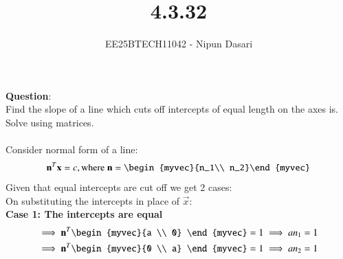 \documentclass[journal]{IEEEtran}
\begin{document}
	
	
	\vspace{3cm}
	
	\title{4.3.32}
	\author{EE25BTECH11042 - Nipun Dasari}
	\maketitle
		
	\renewcommand{\thefigure}{\theenumi}
	\renewcommand{\thetable}{\theenumi}
	\setlength{\intextsep}{10pt} %
	
	
	\renewcommand{\thetable}{\theenumi}
	
	\textbf{Question}:\\
	Find the slope of a line which cuts off intercepts of equal length on the axes is. Solve using matrices. \\ 
	\solution \\
	
	Consider normal form of a line:
	\begin{align}
		\vec{n}^T\vec{x} = c, \text{where } \vec{n} = \begin{myvec}{n_1\\ n_2}\end{myvec}
	\end{align}
	Given that equal intercepts are cut off we get 2 cases:\\
	On substituting the intercepts in place of $\vec{x}$: \\
	\textbf{Case 1: The intercepts are equal }
	\begin{align}
		\implies  \vec{n}^T\begin{myvec}{a \\ 0} \end{myvec} = 1 \implies an_1 = 1 \label{0.2}\\
		\implies \vec{n}^T\begin{myvec}{0 \\ a} \end{myvec} = 1 \implies an_2 = 1 \label{0.3} \\
	\end{align}
	
\end{document}
